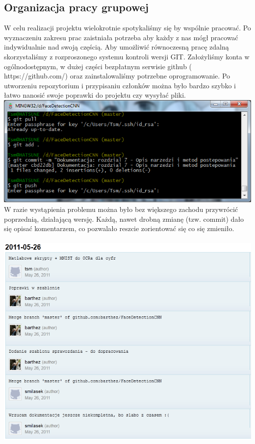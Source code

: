 \documentclass[11pt,a4paper]{article}
\begin{document}
\subsection{Organizacja pracy grupowej}
W celu realizacji projektu wielokrotnie spotykaliśmy się by wspólnie pracować. Po wyznaczeniu zakresu prac zaistniała potrzeba aby każdy z nas mógł pracować indywidualnie nad swoją częścią. Aby umożliwić równoczesną pracę zdalną skorzystaliśmy z rozproszonego systemu kontroli wersji GIT. Założyliśmy konta w ogólnodostępnym, w dużej części bezpłatnym serwisie github ( https://github.com/) oraz zainstalowaliśmy potrzebne oprogramowanie. Po utworzeniu repozytorium i przypisaniu członków można było bardzo szybko i łatwo nanosić swoje poprawki do projektu czy wysyłać pliki.\\
\vspace*{0.5cm}
\includegraphics[scale=0.6]{gitconsole}
\vspace*{0.5cm}\\
W razie wystąpienia problemu można było bez większego zachodu przywrócić poprzednią, działającą wersję. Każdą, nawet drobną zmianę (tzw. commit) dało się opisać komentarzem, co pozwalało reszcie zorientować się co się zmieniło.\\
\vspace*{0.5cm}\\
\includegraphics[scale=0.6]{commits}
\vspace*{0.5cm}\\
\end{document}

